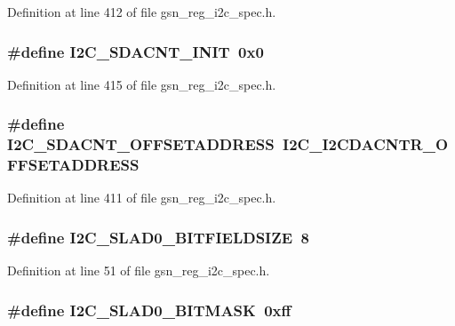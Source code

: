 Definition at line 412 of file gsn\_\-reg\_\-i2c\_\-spec.h.

\hypertarget{a00558_a5be27e9e2ebe7802057c8b0e3a545a0e}{
\subsubsection[{I2C\_\-SDACNT\_\-INIT}]{\setlength{\rightskip}{0pt plus 5cm}\#define I2C\_\-SDACNT\_\-INIT~0x0}}
\label{a00558_a5be27e9e2ebe7802057c8b0e3a545a0e}


Definition at line 415 of file gsn\_\-reg\_\-i2c\_\-spec.h.

\hypertarget{a00558_a52ed411f47eddd567b59b586f53f5baf}{
\subsubsection[{I2C\_\-SDACNT\_\-OFFSETADDRESS}]{\setlength{\rightskip}{0pt plus 5cm}\#define I2C\_\-SDACNT\_\-OFFSETADDRESS~I2C\_\-I2CDACNTR\_\-OFFSETADDRESS}}
\label{a00558_a52ed411f47eddd567b59b586f53f5baf}


Definition at line 411 of file gsn\_\-reg\_\-i2c\_\-spec.h.

\hypertarget{a00558_a372ff75ba44c1a558e3cd8ce94592bdd}{
\subsubsection[{I2C\_\-SLAD0\_\-BITFIELDSIZE}]{\setlength{\rightskip}{0pt plus 5cm}\#define I2C\_\-SLAD0\_\-BITFIELDSIZE~8}}
\label{a00558_a372ff75ba44c1a558e3cd8ce94592bdd}


Definition at line 51 of file gsn\_\-reg\_\-i2c\_\-spec.h.

\hypertarget{a00558_af413bb1776ed7b569c86d0b775ff57ec}{
\subsubsection[{I2C\_\-SLAD0\_\-BITMASK}]{\setlength{\rightskip}{0pt plus 5cm}\#define I2C\_\-SLAD0\_\-BITMASK~0xff}}
\label{a00558_af413bb1776ed7b569c86d0b775ff57ec}


